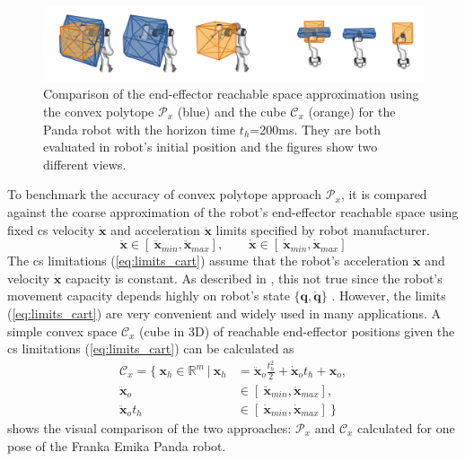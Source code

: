 \begin{figure}[!h]
    \centering
    \includegraphics[width=\linewidth]{Papers/images/comp_200.png}
    \caption{Comparison of the end-effector reachable space approximation using the convex polytope $\mathcal{P}_x$ (blue) and the cube $\mathcal{C}_x$ (orange) for the Panda robot with the horizon time $t_h$=200ms. They are both evaluated in robot's initial position and the figures show two different views.}
    \label{fig:cube}
\end{figure}
To benchmark the accuracy of convex polytope approach $\mathcal{P}_x$, it is compared against the coarse approximation of the robot's end-effector reachable space using fixed \gls{cs} velocity $\dot{\bm{x}}$ and acceleration $\ddot{\bm{x}}$ limits specified by robot manufacturer.
\begin{equation}
    \ddot{\bm{x}}\in [~ \ddot{\bm{x}}_{min},  \ddot{\bm{x}}_{max}], \qquad \dot{\bm{x}} \in [~ \dot{\bm{x}}_{min},  \dot{\bm{x}}_{max}]
    \label{eq:limits_cart}
\end{equation}
The \gls{cs} limitations (\ref{eq:limits_cart}) assume that the robot's acceleration $\ddot{\bm{x}}$ and velocity $\dot{\bm{x}}$ capacity is constant. As described in , this not true since the robot's movement capacity depends highly on robot's state $\{\bm{q},\dot{\bm{q}}\}$ \cite{Bowling2005}. However, the limits (\ref{eq:limits_cart}) are very convenient and widely used in many applications. A simple convex space $\mathcal{C}_x$ (cube in 3D) of reachable end-effector positions given the \gls{cs} limitations (\ref{eq:limits_cart}) can be calculated as
\begin{equation}
\begin{split}
    \mathcal{C}_x = \{ ~\bm{x}_h \in \mathbb{R}^m ~|~ \bm{x}_h &= \ddot{\bm{x}}_o\frac{t_h^2}{2} + \dot{\bm{x}}_ot_h + \bm{x}_o, \\
    \ddot{\bm{x}}_o &\in [~ \ddot{\bm{x}}_{min},  \ddot{\bm{x}}_{max}], \\
    \ddot{\bm{x}}_ot_h &\in [~ \dot{\bm{x}}_{min},  \dot{\bm{x}}_{max}] ~\}
\end{split}
\end{equation}
 shows the visual comparison of the two approaches: $\mathcal{P}_x$ and $\mathcal{C}_x$ calculated for one pose of the {Franka Emika Panda} robot. 

